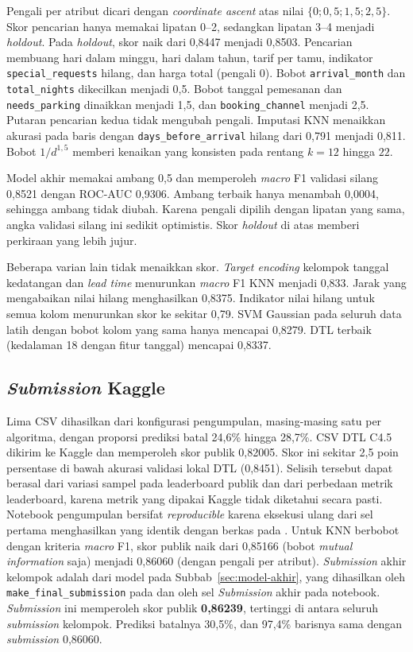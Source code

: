 Pengali per atribut dicari dengan \textit{coordinate ascent} atas nilai $\{0; 0{,}5; 1{,}5; 2{,}5\}$. Skor pencarian hanya memakai lipatan 0--2, sedangkan lipatan 3--4 menjadi \textit{holdout}. Pada \textit{holdout}, skor naik dari 0,8447 menjadi 0,8503. Pencarian membuang hari dalam minggu, hari dalam tahun, tarif per tamu, indikator \texttt{special\_requests} hilang, dan harga total (pengali 0). Bobot \texttt{arrival\_month} dan \texttt{total\_nights} dikecilkan menjadi 0,5. Bobot tanggal pemesanan dan \texttt{needs\_parking} dinaikkan menjadi 1,5, dan \texttt{booking\_channel} menjadi 2,5. Putaran pencarian kedua tidak mengubah pengali. Imputasi KNN menaikkan akurasi pada baris dengan \texttt{days\_before\_arrival} hilang dari 0,791 menjadi 0,811. Bobot $1/d^{1{,}5}$ memberi kenaikan yang konsisten pada rentang $k=12$ hingga $22$.

Model akhir memakai ambang 0,5 dan memperoleh \textit{macro} F1 validasi silang 0,8521 dengan ROC-AUC 0,9306. Ambang terbaik hanya menambah 0,0004, sehingga ambang tidak diubah. Karena pengali dipilih dengan lipatan yang sama, angka validasi silang ini sedikit optimistis. Skor \textit{holdout} di atas memberi perkiraan yang lebih jujur.

Beberapa varian lain tidak menaikkan skor. \textit{Target encoding} kelompok tanggal kedatangan dan \textit{lead time} menurunkan \textit{macro} F1 KNN menjadi 0,833. Jarak yang mengabaikan nilai hilang menghasilkan 0,8375. Indikator nilai hilang untuk semua kolom menurunkan skor ke sekitar 0,79. SVM Gaussian pada seluruh data latih dengan bobot kolom yang sama hanya mencapai 0,8279. DTL terbaik (kedalaman 18 dengan fitur tanggal) mencapai 0,8337.

\subsection{\textit{Submission} Kaggle}
Lima CSV dihasilkan dari konfigurasi pengumpulan, masing-masing satu per algoritma, dengan proporsi prediksi batal 24,6\% hingga 28,7\%. CSV DTL C4.5 dikirim ke Kaggle dan memperoleh skor publik 0,82005. Skor ini sekitar 2,5 poin persentase di bawah akurasi validasi lokal DTL (0,8451). Selisih tersebut dapat berasal dari variasi sampel pada leaderboard publik dan dari perbedaan metrik leaderboard, karena metrik yang dipakai Kaggle tidak diketahui secara pasti. Notebook pengumpulan bersifat \textit{reproducible} karena eksekusi ulang dari sel pertama menghasilkan  yang identik dengan berkas pada . Untuk KNN berbobot dengan kriteria \textit{macro} F1, skor publik naik dari 0,85166 (bobot \textit{mutual information} saja) menjadi 0,86060 (dengan pengali per atribut). \textit{Submission} akhir kelompok adalah  dari model pada Subbab~\ref{sec:model-akhir}, yang dihasilkan oleh \texttt{make\_final\_submission} pada  dan oleh sel \textit{Submission} akhir pada notebook. \textit{Submission} ini memperoleh skor publik \textbf{0,86239}, tertinggi di antara seluruh \textit{submission} kelompok. Prediksi batalnya 30,5\%, dan 97,4\% barisnya sama dengan \textit{submission} 0,86060.
